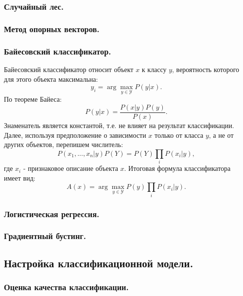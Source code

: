 \documentclass[12pt]{article}
\begin{document}
\subsubsection{Случайный лес.}


\subsubsection{Метод опорных векторов.}


\subsubsection{Байесовский классификатор.}

Байесовский классификатор относит объект $x$ к классу $y$, 
вероятность которого для этого объекта максимальна:
\[
    y_i = \arg \max_{y\in\mathcal{Y}} P(y|x).
\]
По теореме Байеса:
\[
    P(y|x)=\frac{P(x|y)P(y)}{P(x)}.
\]
Знаменатель является константой, т.е. не влияет на результат классификации.
Далее, используя предположение о зависимости $x$ только от класса $y$, а не
от других объектов, перепишем числитель:
\[
    P(x_1, ..., x_n|y)P(Y) = P(Y)\prod_i P(x_i|y),
\]
где $x_i$ - признаковое описание объекта $x$. Итоговая формула классификатора имеет вид:
\[
    A(x)=\arg\max_{y\in\mathcal{Y}} P(y)\prod_i P(x_i|y).
\]

\subsubsection{Логистическая регрессия.}


\subsubsection{Градиентный бустинг.}


\subsection{Настройка классификационной модели.}


\subsubsection{Оценка качества классификации.}
\end{document}
